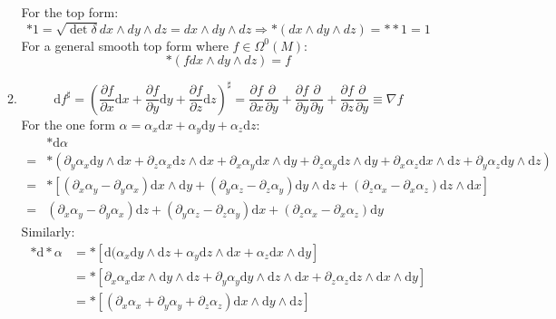 \documentclass[12pt,a4]{article}
\newcommand{\e}{\mathrm{d}}
\begin{document}
\begin{enumerate}
\begin{enumerate}
        For the top form:
        \begin{equation*}
          * 1 = \sqrt{\det \delta} dx \wedge dy \wedge dz = dx \wedge dy \wedge dz \Rightarrow *(dx \wedge dy \wedge dz) = ** 1 = 1
        \end{equation*}
        For a general smooth top form where $f \in \Omega^0(M)$:
        \begin{equation*}
          *(f dx \wedge dy \wedge dz) = f
        \end{equation*}
      \item
        \begin{equation*}
          \e f^\sharp = (\frac{\partial f}{\partial x} \e x + \frac{\partial f}{\partial y} \e y + \frac{\partial f}{\partial z} \e z)^\sharp = \frac{\partial f}{\partial x}\frac{\partial}{\partial y} + \frac{\partial f}{\partial y}\frac{\partial }{\partial y}  + \frac{\partial f}{\partial z}\frac{\partial}{\partial y} \equiv \nabla f
        \end{equation*}
        For the one form $\alpha = \alpha_x \e x + \alpha_y \e y + \alpha_z \e z$:
        \begin{align*}
          &* \e \alpha \\
                      =& *(\partial_y\alpha_x \e y \wedge \e x + \partial_z \alpha_x \e z \wedge \e x + \partial_x\alpha_y \e x \wedge \e y + \partial_z \alpha_y \e z \wedge \e y + \partial_x\alpha_z \e x \wedge \e z + \partial_y \alpha_z \e y \wedge \e z)\\
                      =& *\left[(\partial_x\alpha_y - \partial_y\alpha_x) \e x \wedge \e y + (\partial_y \alpha_z - \partial_z \alpha_y)\e y \wedge \e z + (\partial_z \alpha_x - \partial_x \alpha_z)\e z \wedge \e x \right]\\
                      =& (\partial_x\alpha_y - \partial_y\alpha_x) \e z + (\partial_y \alpha_z - \partial_z \alpha_y) \e x + (\partial_z \alpha_x - \partial_x \alpha_z)\e y 
        \end{align*}
        Similarly:
        \begin{align*}
          * \e * \alpha 
                      &= *\left[\e (\alpha_x \e y \wedge \e z + \alpha_y \e z \wedge \e x + \alpha_z \e x \wedge \e y\right]\\
                      &= *\left[\partial_x \alpha_x \e x \wedge \e y \wedge \e z + \partial_y \alpha_y \e y \wedge \e z \wedge \e x + \partial_z \alpha_z \e z \wedge \e x \wedge \e y\right]\\
                      &= *\left[(\partial_x \alpha_x + \partial_y \alpha_y + \partial_z \alpha_z ) \e x \wedge \e y \wedge \e z\right]\\

\end{align*}
\end{enumerate}
\end{enumerate}
\end{document}
